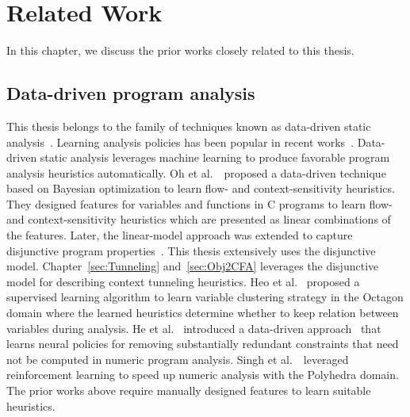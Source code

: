 \chapter{Related Work}
\label{sec:Related}

In this chapter, we discuss the prior works closely related to this thesis.




\section{Data-driven program analysis}
This thesis belongs to the family of techniques known as data-driven static analysis~\cite{Oh2015, CHA20181,cha2016learning,JeJeChOh17,heo2016unsound,He20pldi}.
Learning analysis policies has been popular in recent 
works~\cite{Bielik2017,Peleg2016,Oh2015,JeJeChOh17,Jeon2019,Singh2018cav,heo2017unsound,Heo2019resource,Grigore2016,He2020,WeiR15,Graphick20}.
Data-driven static analysis leverages machine learning to produce favorable program analysis heuristics automatically.
Oh et al.~\cite{Oh2015}~proposed a data-driven technique based on Bayesian optimization to learn flow- and context-sensitivity heuristics.
They designed features for variables and functions in C programs to learn flow- and context-sensitivity heuristics which are presented as linear combinations of the features.
Later, the linear-model approach was extended to capture disjunctive program properties~\cite{JeJeChOh17}.
This thesis extensively uses the disjunctive model. Chapter~\ref{sec:Tunneling} and~\ref{sec:Obj2CFA} leverages the disjunctive model for describing context tunneling heuristics.
Heo et al.~\cite{Heo2016learning} proposed a supervised learning algorithm to learn variable clustering strategy in the Octagon domain
where the learned heuristics determine whether to keep relation between variables during analysis.
He et al.~\cite{He20pldi} introduced a data-driven approach \Lait~that learns neural policies for removing substantially redundant constraints that need not be computed in numeric program analysis.
Singh et al.~\cite{Singh2018cav}~leveraged reinforcement learning to speed up numeric analysis with the Polyhedra domain.
The prior works above require manually designed features to learn suitable heuristics.
